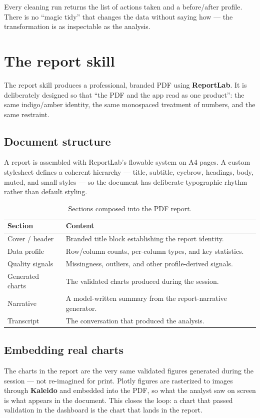 \begin{uanote}
Every cleaning run returns the list of actions taken and a before/after profile.
There is no ``magic tidy'' that changes the data without saying how --- the
transformation is as inspectable as the analysis.
\end{uanote}

\section{The report skill}
The report skill produces a professional, branded PDF using \textbf{ReportLab}.
It is deliberately designed so that ``the PDF and the app read as one product'':
the same indigo/amber identity, the same monospaced treatment of numbers, and
the same restraint.

\subsection{Document structure}
A report is assembled with ReportLab's  flowable system on A4
pages. A custom stylesheet defines a coherent hierarchy --- title, subtitle,
eyebrow, headings, body, muted, and small styles --- so the document has
deliberate typographic rhythm rather than default styling.

\begin{table}[h]
\centering
\caption{Sections composed into the PDF report.}
\small
\begin{tabularx}{\linewidth}{@{}L{3.4cm} X@{}}
\toprule
\textbf{Section} & \textbf{Content} \\
\midrule
Cover / header & Branded title block establishing the report identity. \\
Data profile & Row/column counts, per-column types, and key statistics. \\
Quality signals & Missingness, outliers, and other profile-derived signals. \\
Generated charts & The validated charts produced during the session. \\
Narrative & A model-written summary from the report-narrative generator. \\
Transcript & The conversation that produced the analysis. \\
\bottomrule
\end{tabularx}
\end{table}

\subsection{Embedding real charts}
The charts in the report are the very same validated figures generated during
the session --- not re-imagined for print. Plotly figures are rasterized to
images through \textbf{Kaleido} and embedded into the PDF, so what the analyst
saw on screen is what appears in the document. This closes the loop: a chart
that passed validation in the dashboard is the chart that lands in the report.

